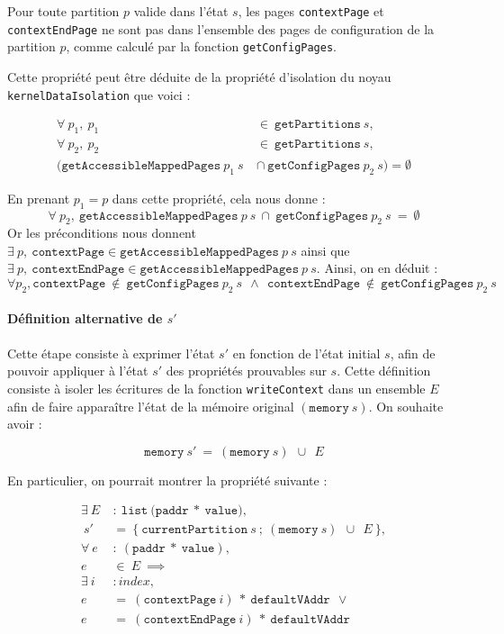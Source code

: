 			\begin{theorem}
				Pour toute partition $p$ valide dans l'état $s$, les pages \texttt{contextPage} et \texttt{contextEndPage} ne sont pas dans l'ensemble des pages de configuration de la partition $p$, comme calculé par la fonction \texttt{getConfigPages}.
			\label{prop:pagesnotconfig}
			\end{theorem}

			Cette propriété peut être déduite de la propriété d'isolation du noyau \texttt{kernelDataIsolation} que voici :

			\begin{align*}
				\forall~p_1,~p_1~&\in~\mathtt{getPartitions}~s,\\
				\forall~p_2,~p_2~&\in~\mathtt{getPartitions}~s,\\
				(\mathtt{getAccessibleMappedPages}~p_1~s~&\cap~\mathtt{getConfigPages}~p_2~s) = \emptyset
			\end{align*}

			En prenant $p_1 = p$ dans cette propriété, cela nous donne : 
			$$\forall~p_2,~\mathtt{getAccessibleMappedPages}~p~s~\cap~\mathtt{getConfigPages}~p_2~s~=~\emptyset$$
			Or les préconditions nous donnent $\exists~p,~\mathtt{contextPage} \in \mathtt{getAccessibleMappedPages}~p~s$ ainsi que $\exists~p,~\mathtt{contextEndPage} \in \mathtt{getAccessibleMappedPages}~p~s$. Ainsi, on en déduit :
			$$\forall p_2, \mathtt{contextPage}~\notin~\mathtt{getConfigPages}~p_2~s~~\wedge~~\mathtt{contextEndPage}~\notin~\mathtt{getConfigPages}~p_2~s$$


			\paragraph{Définition alternative de $s'$} Cette étape consiste à exprimer l'état $s'$ en fonction de l'état initial $s$, afin de pouvoir appliquer à l'état $s'$ des propriétés prouvables sur $s$. Cette définition consiste à isoler les écritures de la fonction \texttt{writeContext} dans un ensemble $E$ afin de faire apparaître l'état de la mémoire original $(\mathtt{memory}~s)$.
			On souhaite avoir :

			$$\mathtt{memory}~s'~=~(\mathtt{memory}~s)~~\cup~~E$$

			En particulier, on pourrait montrer la propriété suivante :

			\begin{align*}
				\exists~E~&:~\mathtt{list}~(\mathtt{paddr}~*~\mathtt{value)},\\
				      ~s'~&=~\mathtt{\{~currentPartition}~s~;~(\mathtt{memory}~s)~~\cup~~E~\mathtt{\}},\\
				\forall~e~&:~(\mathtt{paddr}~*~\mathtt{value}),\\
				        e~&\in~E~\implies\\
				\exists~i~&: index,\\
				        e~&=~(\mathtt{contextPage}~i)~*~\mathtt{defaultVAddr}~~\lor\\
				        e~&=~(\mathtt{contextEndPage}~i)~*~\mathtt{defaultVAddr}
			\end{align*}

